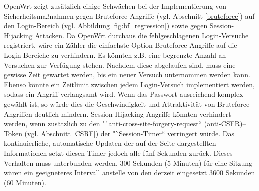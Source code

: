 \documentclass[a4paper]{book}
\begin{document}
\begin{large}
\begin{onehalfspace}
\indent OpenWrt zeigt zusätzlich einige Schwächen bei der Implementierung von Sicherheitsmaßnahmen gegen Bruteforce Angriffe (vgl. Abschnitt \ref{bruteforce}) auf den Login-Bereich (vgl. Abbildung \ref{fig:bf_regression}) sowie gegen Session-Hijacking Attacken. Da OpenWrt durchaus die fehlgeschlagenen Login-Versuche registriert, wäre ein Zähler die einfachste Option Bruteforce Angriffe auf die Login-Bereiche zu verhindern. Es könnten z.B. eine begrenzte Anzahl an Versuchen zur Verfügung stehen. Nachdem diese abgelaufen sind, muss eine gewisse Zeit gewartet werden, bis ein neuer Versuch unternommen werden kann. Ebenso könnte ein \mbox Zeitlimit zwischen jedem Login-Versuch implementiert werden, sodass ein Angriff verlangsamt wird. Wenn das Passwort ausreichend komplex gewählt ist, so würde dies die Geschwindigkeit und Attraktivität von Bruteforce Angriffen deutlich mindern. Session-Hijacking Angriffe könnten verhindert werden, wenn zusätzlich zu den "`anti-cross-site-forgery-request“ (anti-CSFR)–Token (vgl. Abschnitt \ref{CSRF}) der "`Session-Timer“ verringert würde. Das kontinuierliche, automatische Updaten der auf der Seite dargestellten Informationen setzt diesen Timer jedoch alle fünf Sekunden zurück. Dieses Verhalten muss unterbunden werden. 300 Sekunden (5 Minuten) für eine Sitzung wären ein geeigneteres Intervall anstelle von den derzeit eingesetzt 3600 Sekunden (60 \mbox Minuten). 



\end{onehalfspace}
\end{large}
\end{document}

